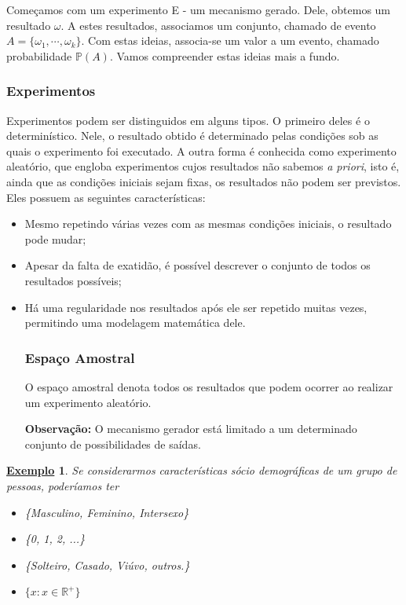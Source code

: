 \documentclass{article}
\newtheorem{example}{\underline{Exemplo}}
\begin{document}
  Começamos com um experimento E - um mecanismo gerado. Dele, obtemos um resultado \(\omega \). A estes resultados,
associamos um conjunto, chamado de evento \(A = \{\omega_{1}, \cdots, \omega_{k}\}\). Com estas ideias, associa-se um valor
a um evento, chamado probabilidade \(\mathbb{P}(A).\) Vamos compreender estas ideias mais a fundo.

\subsubsection{Experimentos}
  Experimentos podem ser distinguidos em alguns tipos. O primeiro deles é o determinístico. Nele,
o resultado obtido é determinado pelas condições sob as quais o experimento foi executado. A outra forma 
é conhecida como experimento aleatório, que engloba experimentos cujos resultados não sabemos \textit{a priori}, isto é,
 ainda que as condições iniciais sejam fixas, os resultados não podem ser previstos. Eles possuem as seguintes características:
 \begin{itemize}
   \item[a)] Mesmo repetindo várias vezes com as mesmas condições iniciais, o resultado pode mudar;
   \item[b)] Apesar da falta de exatidão, é possível descrever o conjunto de todos os resultados possíveis;
   \item[c)] Há uma regularidade nos resultados após ele ser repetido muitas vezes, permitindo uma modelagem matemática dele.
\subsubsection{Espaço Amostral}
  O espaço amostral denota todos os resultados que podem ocorrer ao realizar um experimento aleatório.
  
  \textbf{Observação:} O mecanismo gerador está limitado a um determinado conjunto de possibilidades de saídas.
 \end{itemize}
\begin{example}
  Se considerarmos características sócio demográficas de um grupo de pessoas, poderíamos ter
 \begin{itemize}
   \item[Sexo:)] \{Masculino, Feminino, Intersexo\}
   \item[Idade:)] \{0, 1, 2, ...\}
   \item[Estado civil:)] \{Solteiro, Casado, Viúvo, outros.\}
   \item[Renda familiar:)] \(\{x: x\in \mathbb{R}^{+}\}\)
 \end{itemize}
\end{example}
\end{document}
